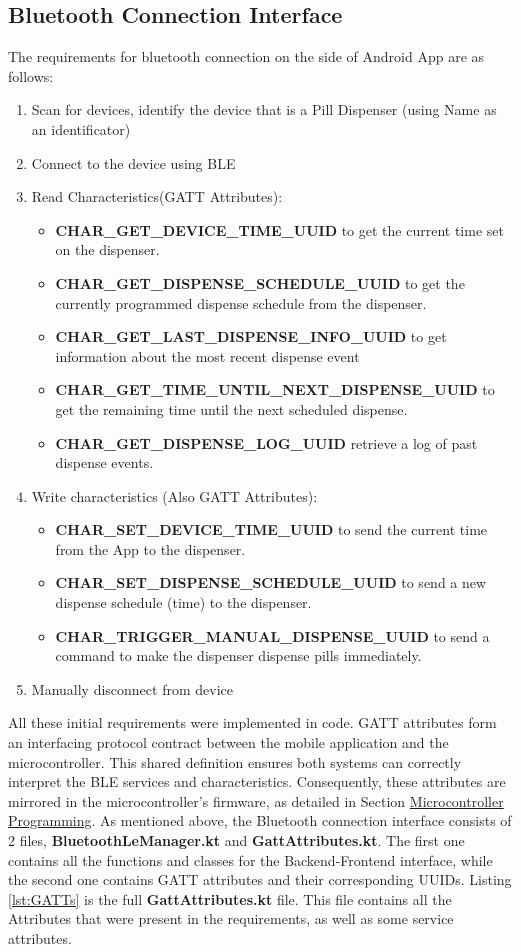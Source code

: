 \subsection{Bluetooth Connection Interface}\label{subsec:Bluetooth}
The requirements for bluetooth connection on the side of Android App are as follows:
\begin{enumerate}
	\item Scan for devices, identify the device that is a Pill Dispenser (using Name as an identificator)
	\item Connect to the device using \ac{BLE}
	\item Read Characteristics(\ac{GATT} Attributes): 
	\begin{itemize}
		\item \textbf{CHAR\_GET\_DEVICE\_TIME\_UUID} to get the current time set on the dispenser.
		\item \textbf{CHAR\_GET\_DISPENSE\_SCHEDULE\_UUID} to get the currently programmed dispense schedule from the dispenser.
		\item \textbf{CHAR\_GET\_LAST\_DISPENSE\_INFO\_UUID} to get information about the most recent dispense event
		\item \textbf{CHAR\_GET\_TIME\_UNTIL\_NEXT\_DISPENSE\_UUID} to get the remaining time until the next scheduled dispense.
		\item \textbf{CHAR\_GET\_DISPENSE\_LOG\_UUID} retrieve a log of past dispense events.
	\end{itemize}
	\item Write characteristics (Also \ac{GATT} Attributes):
	\begin{itemize}
		\item \textbf{CHAR\_SET\_DEVICE\_TIME\_UUID} to send the current time from the App to the dispenser.
		\item \textbf{CHAR\_SET\_DISPENSE\_SCHEDULE\_UUID} to send a new dispense schedule (time) to the dispenser.
		\item \textbf{CHAR\_TRIGGER\_MANUAL\_DISPENSE\_UUID} to send a command to make the dispenser dispense pills immediately.
	\end{itemize}
	\item Manually disconnect from device
\end{enumerate}
All these initial requirements were implemented in code. \ac{GATT} attributes form an interfacing protocol contract between the mobile application and the microcontroller. This shared definition ensures both systems can correctly interpret the \ac{BLE} services and characteristics. Consequently, these attributes are mirrored in the microcontroller's firmware, as detailed in Section  \hyperref[sec:Backenddev]{Microcontroller Programming}. As mentioned above, the Bluetooth connection interface consists of 2 files, \textbf{BluetoothLeManager.kt} and \textbf{GattAttributes.kt}. The first one contains all the functions and classes for the Backend-Frontend interface, while the second one contains \ac{GATT} attributes and their corresponding \ac{UUID}s. Listing \ref{lst:GATTs} is the full \textbf{GattAttributes.kt} file. This file contains all the Attributes that were present in the requirements, as well as some service attributes.
